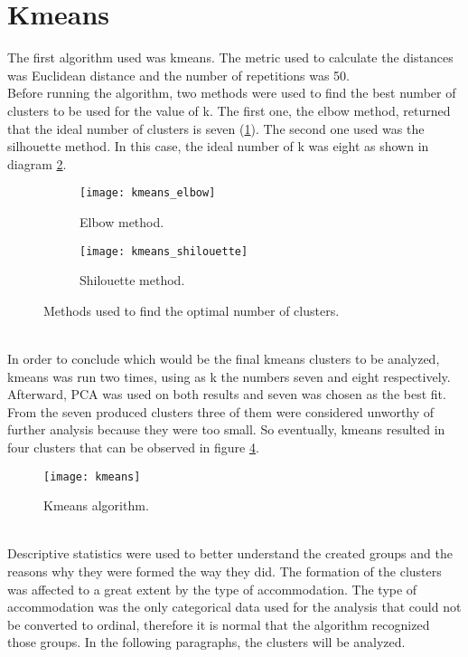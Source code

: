 \section{Kmeans}
The first algorithm used was kmeans. The metric used to calculate the distances was Euclidean distance and the number of repetitions was 50. \\
Before running the algorithm, two methods were used to find the best number of clusters to be used for the value of k. The first one, the elbow method, returned that the ideal number of clusters is seven (\ref{fig:elbow}). The second one used was the silhouette method. In this case, the ideal number of k was eight as shown in diagram \ref{fig:shilouette}.
\begin{figure}[ht]
\centering
\begin{subfigure}{.5\textwidth}
\centering
\texttt{[image: kmeans\_elbow]}
\caption{Elbow method.}
\label{fig:elbow}
\end{subfigure}%
\begin{subfigure}{.5\textwidth}
\centering
\texttt{[image: kmeans\_shilouette]}
\caption{Shilouette method.}
\label{fig:shilouette}
\end{subfigure}%
\caption{Methods used to find the optimal number of clusters.}
\label{fig:methods}
\end{figure}
\\
In order to conclude which would be the final kmeans clusters to be analyzed, kmeans was run two times, using as k the numbers seven and eight respectively. Afterward, PCA was used on both results and seven was chosen as the best fit. From the seven produced clusters three of them were considered unworthy of further analysis because they were too small. So eventually, kmeans resulted in four clusters that can be observed in figure \ref{fig:kmeans}. \\
\begin{figure}[ht]
\centering
\texttt{[image: kmeans]}
\caption{Kmeans algorithm.}
\label{fig:kmeans}
\end{figure}
\\
Descriptive statistics were used to better understand the created groups and the reasons why they were formed the way they did. The formation of the clusters was affected to a great extent by the type of accommodation. The type of accommodation was the only categorical data used for the analysis that could not be converted to ordinal, therefore it is normal that the algorithm recognized those groups. In the following paragraphs, the clusters will be analyzed. \\
